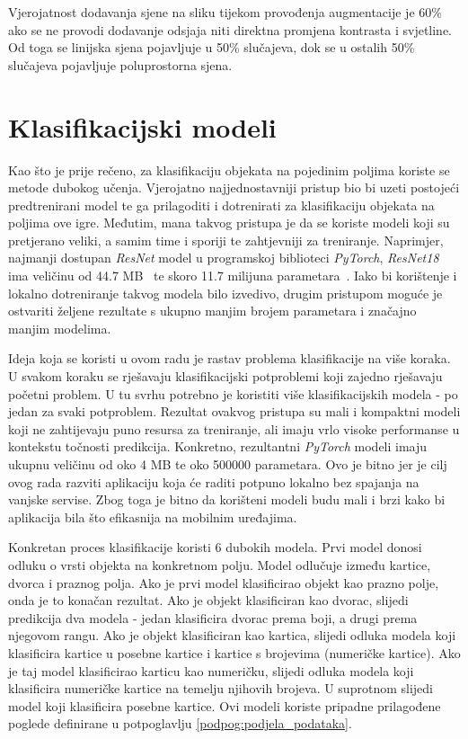 \documentclass[diplomskirad]{fer}
\begin{document}
			Vjerojatnost dodavanja sjene na sliku tijekom provođenja augmentacije je 60\% ako se ne provodi dodavanje odsjaja niti direktna promjena kontrasta i svjetline. Od toga se linijska sjena pojavljuje u 50\% slučajeva, dok se u ostalih 50\% slučajeva pojavljuje poluprostorna sjena.
	
	\section{Klasifikacijski modeli}
	\label{pog:klasifikacija}
	
		Kao što je prije rečeno, za klasifikaciju objekata na pojedinim poljima koriste se metode dubokog učenja. Vjerojatno najjednostavniji pristup bio bi uzeti postojeći predtrenirani model te ga prilagoditi i dotrenirati za klasifikaciju objekata na poljima ove igre. Međutim, mana takvog pristupa je da se koriste modeli koji su pretjerano veliki, a samim time i sporiji te zahtjevniji za treniranje. Naprimjer, najmanji dostupan \textit{ResNet} model u programskoj biblioteci \textit{PyTorch}, \textit{ResNet18} ima veličinu od 44.7 MB~\cite{ResNet18} te skoro 11.7 milijuna parametara~\cite{ResNet18}. Iako bi korištenje i lokalno dotreniranje takvog modela bilo izvedivo, drugim pristupom moguće je ostvariti željene rezultate s ukupno manjim brojem parametara i značajno manjim modelima.
		
		Ideja koja se koristi u ovom radu je rastav problema klasifikacije na više koraka. U svakom koraku se rješavaju klasifikacijski potproblemi koji zajedno rješavaju početni problem. U tu svrhu potrebno je koristiti više klasifikacijskih modela - po jedan za svaki potproblem. Rezultat ovakvog pristupa su mali i kompaktni modeli koji ne zahtijevaju puno resursa za treniranje, ali imaju vrlo visoke performanse u kontekstu točnosti predikcija. Konkretno, rezultantni \textit{PyTorch} modeli imaju ukupnu veličinu od oko 4 MB te oko 500000 parametara. Ovo je bitno jer je cilj ovog rada razviti aplikaciju koja će raditi potpuno lokalno bez spajanja na vanjske servise. Zbog toga je bitno da korišteni modeli budu mali i brzi kako bi aplikacija bila što efikasnija na mobilnim uređajima.
		
		Konkretan proces klasifikacije koristi 6 dubokih modela. Prvi model donosi odluku o vrsti objekta na konkretnom polju. Model odlučuje između kartice, dvorca i praznog polja. Ako je prvi model klasificirao objekt kao prazno polje, onda je to konačan rezultat. Ako je objekt klasificiran kao dvorac, slijedi predikcija dva modela - jedan klasificira dvorac prema boji, a drugi prema njegovom rangu. Ako je objekt klasificiran kao kartica, slijedi odluka modela koji klasificira kartice u posebne kartice i kartice s brojevima (numeričke kartice). Ako je taj model klasificirao karticu kao numeričku, slijedi odluka modela koji klasificira numeričke kartice na temelju njihovih brojeva. U suprotnom slijedi model koji klasificira posebne kartice. Ovi modeli koriste pripadne prilagođene poglede definirane u potpoglavlju \ref{podpog:podjela_podataka}.
		
\end{document}
